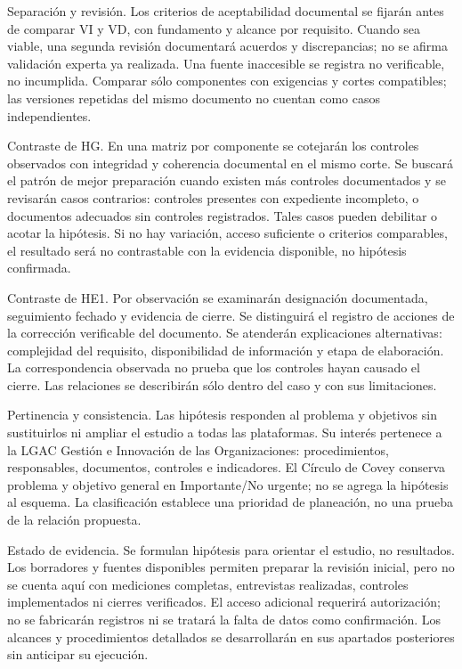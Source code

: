 {Separación y revisión. Los criterios de aceptabilidad documental se fijarán antes de comparar VI y VD, con fundamento y alcance por requisito. Cuando sea viable, una segunda revisión documentará acuerdos y discrepancias; no se afirma validación experta ya realizada. Una fuente inaccesible se registra no verificable, no incumplida. Comparar sólo componentes con exigencias y cortes compatibles; las versiones repetidas del mismo documento no cuentan como casos independientes.


Contraste de HG. En una matriz por componente se cotejarán los controles observados con integridad y coherencia documental en el mismo corte. Se buscará el patrón de mejor preparación cuando existen más controles documentados y se revisarán casos contrarios: controles presentes con expediente incompleto, o documentos adecuados sin controles registrados. Tales casos pueden debilitar o acotar la hipótesis. Si no hay variación, acceso suficiente o criterios comparables, el resultado será no contrastable con la evidencia disponible, no hipótesis confirmada.


Contraste de HE1. Por observación se examinarán designación documentada, seguimiento fechado y evidencia de cierre. Se distinguirá el registro de acciones de la corrección verificable del documento. Se atenderán explicaciones alternativas: complejidad del requisito, disponibilidad de información y etapa de elaboración. La correspondencia observada no prueba que los controles hayan causado el cierre. Las relaciones se describirán sólo dentro del caso y con sus limitaciones.


Pertinencia y consistencia. Las hipótesis responden al problema y objetivos sin sustituirlos ni ampliar el estudio a todas las plataformas. Su interés pertenece a la LGAC Gestión e Innovación de las Organizaciones: procedimientos, responsables, documentos, controles e indicadores. El Círculo de Covey conserva problema y objetivo general en Importante/No urgente; no se agrega la hipótesis al esquema. La clasificación establece una prioridad de planeación, no una prueba de la relación propuesta.


Estado de evidencia. Se formulan hipótesis para orientar el estudio, no resultados. Los borradores y fuentes disponibles permiten preparar la revisión inicial, pero no se cuenta aquí con mediciones completas, entrevistas realizadas, controles implementados ni cierres verificados. El acceso adicional requerirá autorización; no se fabricarán registros ni se tratará la falta de datos como confirmación. Los alcances y procedimientos detallados se desarrollarán en sus apartados posteriores sin anticipar su ejecución.


}
